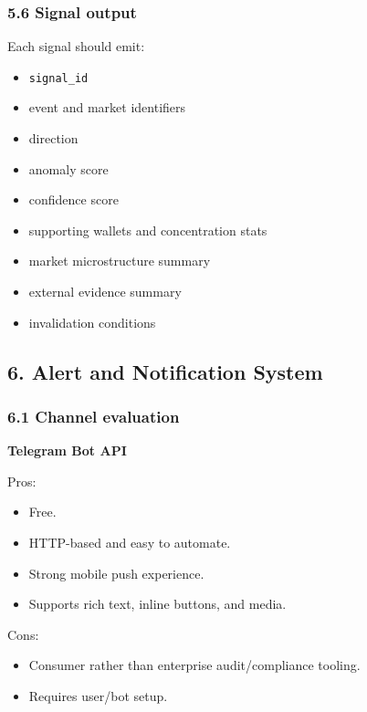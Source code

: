 \documentclass[
]{article}
\providecommand{\tightlist}{%
  \setlength{\itemsep}{0pt}\setlength{\parskip}{0pt}}
\begin{document}
\subsubsection{5.6 Signal output}\label{56-signal-output}

Each signal should emit:

\begin{itemize}
\tightlist
\item
  \texttt{signal\_id}
\item
  event and market identifiers
\item
  direction
\item
  anomaly score
\item
  confidence score
\item
  supporting wallets and concentration stats
\item
  market microstructure summary
\item
  external evidence summary
\item
  invalidation conditions
\end{itemize}

\subsection{6. Alert and Notification
System}\label{6-alert-and-notification-system}

\subsubsection{6.1 Channel evaluation}\label{61-channel-evaluation}

\textbf{Telegram Bot API}

Pros:

\begin{itemize}
\tightlist
\item
  Free.
\item
  HTTP-based and easy to automate.
\item
  Strong mobile push experience.
\item
  Supports rich text, inline buttons, and media.
\end{itemize}

Cons:

\begin{itemize}
\tightlist
\item
  Consumer rather than enterprise audit/compliance tooling.
\item
  Requires user/bot setup.
\end{itemize}
\end{document}
